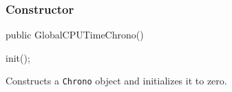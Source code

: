 \subsubsection*{Constructor}

\begin{code}

   public GlobalCPUTimeChrono()\begin{hide} {
      init();
   }\end{hide}
\end{code}
  \begin{tabb} Constructs a \texttt{Chrono} object and initializes it to zero.
  \end{tabb}

\begin{code}\begin{hide}
}\end{hide}
\end{code}

